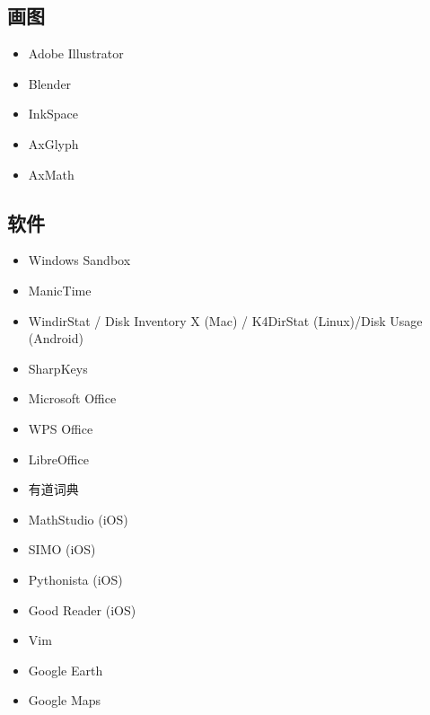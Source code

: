 \subsection{画图}
\begin{itemize}
\item Adobe Illustrator
\item Blender
\item InkSpace
\item AxGlyph
\item AxMath
\end{itemize}

\subsection{软件}
\begin{itemize}
\item Windows Sandbox
\item ManicTime
\item WindirStat / Disk Inventory X (Mac) / K4DirStat (Linux)/Disk Usage (Android)
\item SharpKeys
\item Microsoft Office
\item WPS Office
\item LibreOffice
\item 有道词典
\item MathStudio (iOS)
\item SIMO (iOS)
\item Pythonista (iOS)
\item Good Reader (iOS)
\item Vim
\item Google Earth
\item Google Maps
\end{itemize}

